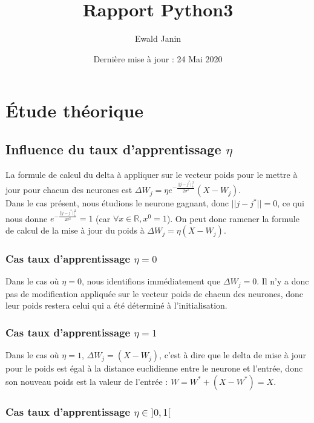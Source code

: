 \documentclass{article}
\title{Rapport Python3}
\author{Ewald Janin }
\date{Dernière mise à jour : 24 Mai 2020}
\begin{document}
\maketitle

\section{Étude théorique}


\subsection{Influence du taux d'apprentissage $\eta$}

La formule de calcul du delta à appliquer sur le vecteur poids pour le mettre à jour pour chacun des neurones est $\Delta W_j = \eta e^{-\frac{||j-j^*||^2_c}{2\sigma^2}}(X-W_j)$.
\\Dans le cas présent, nous étudions le neurone gagnant, donc $||j-j^*|| = 0$, ce qui nous donne $e^{-\frac{||j-j^*||^2_c}{2\sigma^2}} = 1$ (car $\forall x \in \mathbb{R}, x^0 = 1$). On peut donc ramener la formule de calcul de la mise à jour du poids à $\Delta W_j = \eta (X-W_j)$.

\subsubsection{Cas taux d'apprentissage $\eta = 0$}

Dans le cas où $\eta = 0$, nous identifions immédiatement que $\Delta W_j = 0$. Il n'y a donc pas de modification appliquée sur le vecteur poids de chacun des neurones, donc leur poids restera celui qui a été déterminé à l'initialisation.

\subsubsection{Cas taux d'apprentissage $\eta = 1$}

Dans le cas où $\eta = 1$, $\Delta W_j = (X-W_j)$, c'est à dire que le delta de mise à jour pour le poids est égal à la distance euclidienne entre le neurone et l'entrée, donc son nouveau poids est la valeur de l'entrée : $W = W^* + (X-W^*) = X$.

\subsubsection{Cas taux d'apprentissage $\eta \in  ]0,1[$}
\end{document}
